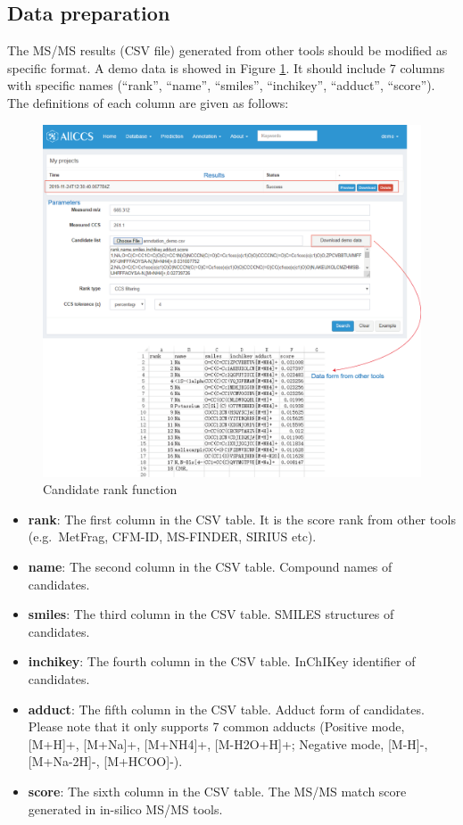 \documentclass[12pt,]{book}
\providecommand{\tightlist}{%
  \setlength{\itemsep}{0pt}\setlength{\parskip}{0pt}}
\begin{document}
\subsection{Data preparation}\label{chapter4d2d1}

The MS/MS results (CSV file) generated from other tools should be
modified as specific format. A demo data is showed in Figure
\ref{fig:figure4d3}. It should include 7 columns with specific names
(``rank'', ``name'', ``smiles'', ``inchikey'', ``adduct'', ``score'').
The definitions of each column are given as follows:

\begin{figure}

{\centering \includegraphics{images/chapter4/figure4.3candidate_rank} 

}

\caption{Candidate rank function}\label{fig:figure4d3}
\end{figure}

\begin{itemize}
\tightlist
\item
  \textbf{rank}: The first column in the CSV table. It is the score rank
  from other tools (e.g.~MetFrag, CFM-ID, MS-FINDER, SIRIUS etc).
\item
  \textbf{name}: The second column in the CSV table. Compound names of
  candidates.
\item
  \textbf{smiles}: The third column in the CSV table. SMILES structures
  of candidates.
\item
  \textbf{inchikey}: The fourth column in the CSV table. InChIKey
  identifier of candidates.
\item
  \textbf{adduct}: The fifth column in the CSV table. Adduct form of
  candidates. Please note that it only supports 7 common adducts
  (Positive mode, {[}M+H{]}+, {[}M+Na{]}+, {[}M+NH4{]}+, {[}M-H2O+H{]}+;
  Negative mode, {[}M-H{]}-, {[}M+Na-2H{]}-, {[}M+HCOO{]}-).
\item
  \textbf{score}: The sixth column in the CSV table. The MS/MS match
  score generated in in-silico MS/MS tools.
\end{itemize}
\end{document}
